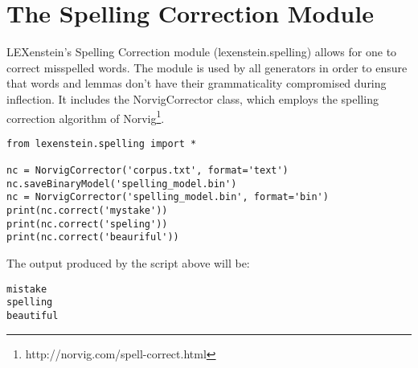 \chapter{The Spelling Correction Module}
\label{spelling}

LEXenstein's Spelling Correction module (lexenstein.spelling) allows for one to correct misspelled words. The module is used by all generators in order to ensure that words and lemmas don't have their grammaticality compromised during inflection. It includes the NorvigCorrector class, which employs the spelling correction algorithm of Norvig\footnote{http://norvig.com/spell-correct.html}.

\begin{lstlisting}
from lexenstein.spelling import *

nc = NorvigCorrector('corpus.txt', format='text')
nc.saveBinaryModel('spelling_model.bin')
nc = NorvigCorrector('spelling_model.bin', format='bin')
print(nc.correct('mystake'))
print(nc.correct('speling'))
print(nc.correct('beauriful'))
\end{lstlisting}

The output produced by the script above will be:

\begin{lstlisting}
mistake
spelling
beautiful
\end{lstlisting}
